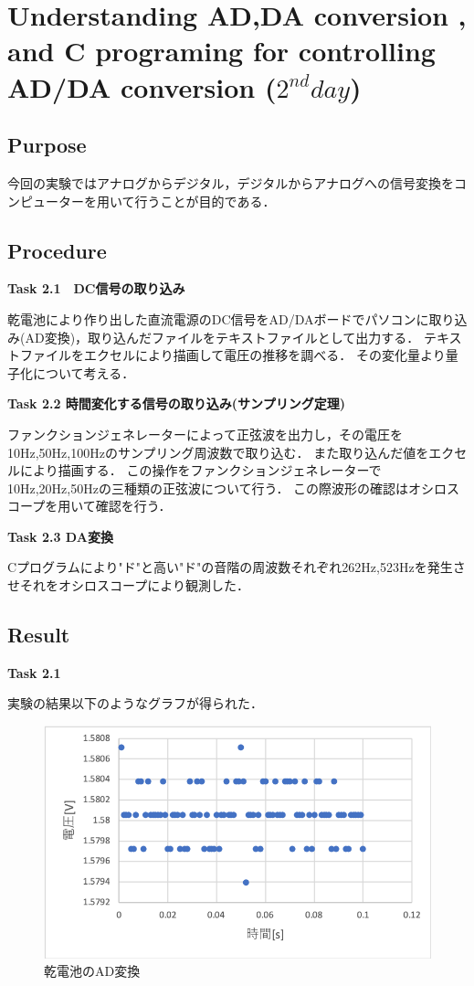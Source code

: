 \documentclass[11pt, a4paper,twocolumn]{jarticle}
\begin{document}
\section{Understanding AD,DA conversion , and C programing for controlling AD/DA conversion ($2^{nd} day$)}
\subsection{Purpose}
今回の実験ではアナログからデジタル，デジタルからアナログへの信号変換をコンピューターを用いて行うことが目的である．
\subsection{Procedure}
\noindent
\textbf{Task 2.1　DC信号の取り込み}

乾電池により作り出した直流電源のDC信号をAD/DAボードでパソコンに取り込み(AD変換)，取り込んだファイルをテキストファイルとして出力する．
テキストファイルをエクセルにより描画して電圧の推移を調べる．
その変化量より量子化について考える．

\noindent
\textbf{Task 2.2 時間変化する信号の取り込み(サンプリング定理)}

ファンクションジェネレーターによって正弦波を出力し，その電圧を10Hz,50Hz,100Hzのサンプリング周波数で取り込む．
また取り込んだ値をエクセルにより描画する．
この操作をファンクションジェネレーターで10Hz,20Hz,50Hzの三種類の正弦波について行う．
この際波形の確認はオシロスコープを用いて確認を行う．

\noindent
\textbf{Task 2.3 DA変換}

Cプログラムにより"ド"と高い"ド"の音階の周波数それぞれ262Hz,523Hzを発生させそれをオシロスコープにより観測した．

\subsection{Result}
\noindent
\textbf{Task 2.1}

実験の結果以下のようなグラフが得られた．

\begin{figure}[htbp]
 \begin{center}
  \includegraphics[width=0.8\linewidth]{fig2.png}
 \end{center}
 \caption{乾電池のAD変換}
 \label{fig:2}
\end{figure}
\end{document}

